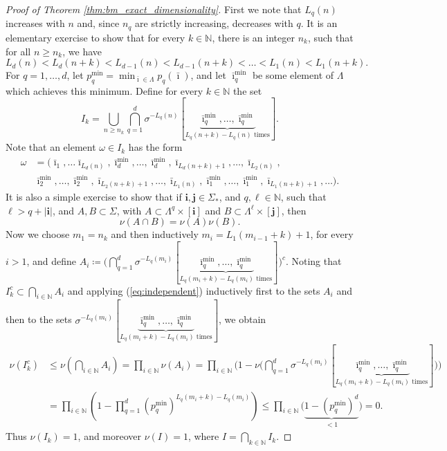 \documentclass{PRM}
\newcommand{\field}[1]{\mathbb{#1}}
\newcommand{\N}{\field{N}}
\theoremstyle{plain}
\theoremstyle{definition}
\theoremstyle{remark}
\begin{document}
\begin{proof}[Proof of Theorem \ref{thm:bm_exact_dimensionality}]
First we note that $L_q(n)$ increases with $n$ and, since $n_q$ are strictly increasing, decreases with $q$. It is an elementary exercise to show that for every $k\in\N$, there is an integer $n_k$, such that for all $n\geq n_k$, we have
\begin{equation*}
    L_d(n)< L_d(n+k)<L_{d-1}(n)<L_{d-1}(n+k)<\ldots<L_1(n)<L_1(n+k).
\end{equation*}
For $q=1,\ldots,d$, let $p_q^{\min}=\min_{\bar{\imath}\in\Lambda}p_q(\bar{\imath})$, and let $\bar{\imath}_q^{\min}$ be some element of $\Lambda$ which achieves this minimum. Define for every $k\in\N$ the set
\begin{equation*}
    I_k=\bigcup_{n\geq n_k}\bigcap_{q=1}^{d}\sigma^{-L_q(n)}[\underbrace{\bar{\imath}_q^{\min},\ldots,\bar{\imath}_q^{\min}}_{L_q(n+k)-L_q(n)\text{ times}}].
\end{equation*}
Note that an element $\omega\in I_k$ has the form
\begin{align}
    \omega&=(\bar{\imath}_1,\ldots \bar{\imath}_{L_d(n)},\bar{\imath}_d^{\min},\ldots,\bar{\imath}_d^{\min},\bar{\imath}_{L_d(n+k)+1},\ldots,\bar{\imath}_{L_{2}(n)},\label{eq:omegaform}\\
    &\bar{\imath}_2^{\min},\ldots,\bar{\imath}_2^{\min}, \bar{\imath}_{L_2(n+k)+1},\ldots,\bar{\imath}_{L_1(n)},\bar{\imath}_1^{\min},\ldots,\bar{\imath}_1^{\min},\bar{\imath}_{L_1(n+k)+1},\ldots).\nonumber
\end{align}
It is also a simple exercise to show that if $\mathbf{i},\mathbf{j}\in\Sigma_*$, and $q,\ell\in \N$, such that $\ell > q+|\mathbf{i}|$, and $A,B\subset \Sigma$, with $A\subset \Lambda^q\times[\mathbf{i}]$ and $B\subset \Lambda^{\ell}\times[\mathbf{j}]$, then
\begin{equation}\label{eq:independent}
    \nu(A\cap B)=\nu(A)\nu(B).
\end{equation}
Now we choose $m_1=n_k$ and then inductively $m_i=L_1(m_{i-1}+k)+1$, for every $i>1$, and define $A_i\coloneqq\big(\bigcap_{q=1}^{d}\sigma^{-L_q(m_i)}[\underbrace{\bar{\imath}_q^{\min},\ldots,\bar{\imath}_q^{\min}}_{L_q(m_i+k)-L_q(m_i)\text{ times}}]\big)^c$. Noting that $I_k^c\subset\bigcap_{i\in\N}A_i$ and applying (\ref{eq:independent}) inductively first to the sets $A_i$ and then to the sets $\sigma^{-L_q(m_i)}[\underbrace{\bar{\imath}_q^{\min},\ldots,\bar{\imath}_q^{\min}}_{L_q(m_i+k)-L_q(m_i)\text{ times}}]$, we obtain
\begin{align*}
    \nu(I_k^c)&\leq\nu\left(\bigcap_{i\in\N}A_i\right)= \prod_{i\in\N}\nu(A_i)=\prod_{i\in\N}\Bigg(1-\nu\bigg(\bigcap_{q=1}^{d}\sigma^{-L_q(m_i)}[\underbrace{\bar{\imath}_q^{\min},\ldots,\bar{\imath}_q^{\min}}_{L_q(m_i+k)-L_q(m_i)\text{ times}}]\bigg)\Bigg)\\
    &=\prod_{i\in\N}\left(1-\prod_{q=1}^{d}(p_q^{\min})^{L_q(m_i+k)-L_q(m_i)}\right)\leq \prod_{i\in\N}\Bigg(\underbrace{1-(p_q^{\min})^d}_{<1}\Bigg)=0.
\end{align*}
Thus $\nu(I_k)=1$, and moreover
$\nu(I)=1$, where $I=\bigcap_{k\in\N}I_k$.


\end{proof}
\end{document}
